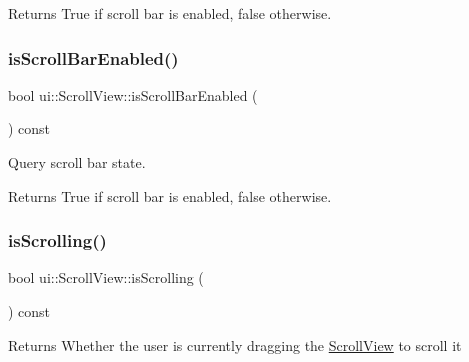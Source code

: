\begin{DoxyReturn}{Returns}
True if scroll bar is enabled, false otherwise. 
\end{DoxyReturn}
\mbox{\label{classui_1_1ScrollView_a7af0f12dd78e55e143db6efb5aa29dfe}} 
\subsubsection{\texorpdfstring{is\+Scroll\+Bar\+Enabled()}{isScrollBarEnabled()}\hspace{0.1cm}{\footnotesize\ttfamily [2/2]}}
{\footnotesize\ttfamily bool ui\+::\+Scroll\+View\+::is\+Scroll\+Bar\+Enabled (\begin{DoxyParamCaption}{ }\end{DoxyParamCaption}) const}



Query scroll bar state. 

\begin{DoxyReturn}{Returns}
True if scroll bar is enabled, false otherwise. 
\end{DoxyReturn}
\mbox{\label{classui_1_1ScrollView_a86c495325ca9ad778672d6819724bf83}} 
\subsubsection{\texorpdfstring{is\+Scrolling()}{isScrolling()}}
{\footnotesize\ttfamily bool ui\+::\+Scroll\+View\+::is\+Scrolling (\begin{DoxyParamCaption}{ }\end{DoxyParamCaption}) const\hspace{0.3cm}{\ttfamily [inline]}}

\begin{DoxyReturn}{Returns}
Whether the user is currently dragging the \hyperlink{classui_1_1ScrollView}{Scroll\+View} to scroll it 
\end{DoxyReturn}
\mbox{\label{classui_1_1ScrollView_a239246ce0e70711ca19504badf56db13}} 
